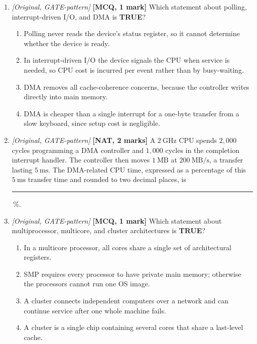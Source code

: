 \documentclass[11pt]{article}
\begin{document}
\begin{enumerate}
\item[\textbf{Q8}] \textit{[Original, GATE-pattern]} \textbf{[MCQ, 1 mark]} Which statement about polling, interrupt-driven I/O, and DMA is \textbf{TRUE}?

\begin{enumerate}
  \item[(A)] Polling never reads the device's status register, so it cannot determine whether the device is ready.
  \item[(B)] In interrupt-driven I/O the device signals the CPU when service is needed, so CPU cost is incurred per event rather than by busy-waiting.
  \item[(C)] DMA removes all cache-coherence concerns, because the controller writes directly into main memory.
  \item[(D)] DMA is cheaper than a single interrupt for a one-byte transfer from a slow keyboard, since setup cost is negligible.
\end{enumerate}

\item[\textbf{Q9}] \textit{[Original, GATE-pattern]} \textbf{[NAT, 2 marks]} A $2\ \text{GHz}$ CPU spends $2{,}000$ cycles programming a DMA controller and $1{,}000$ cycles in the completion interrupt handler. The controller then moves $1\ \text{MB}$ at $200\ \text{MB/s}$, a transfer lasting $5\ \text{ms}$. The DMA-related CPU time, expressed as a percentage of this $5\ \text{ms}$ transfer time and rounded to two decimal places, is \rule{1.5cm}{0.4pt}\,\%.

\item[\textbf{Q10}] \textit{[Original, GATE-pattern]} \textbf{[MCQ, 1 mark]} Which statement about multiprocessor, multicore, and cluster architectures is \textbf{TRUE}?

\begin{enumerate}
  \item[(A)] In a multicore processor, all cores share a single set of architectural registers.
  \item[(B)] SMP requires every processor to have private main memory; otherwise the processors cannot run one OS image.
  \item[(C)] A cluster connects independent computers over a network and can continue service after one whole machine fails.
  \item[(D)] A cluster is a single chip containing several cores that share a last-level cache.
\end{enumerate}

\end{enumerate}
\end{document}
